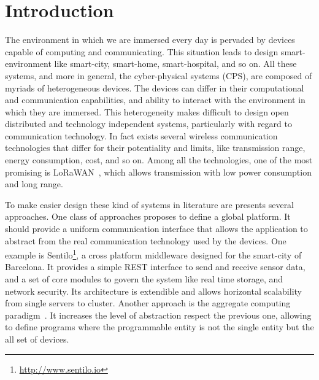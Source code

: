 \chapter{Introduction}
\label{chap:introduction}
The environment in which we are immersed every day is pervaded by devices capable of computing and communicating.
This situation leads to design smart-environment like smart-city, smart-home, smart-hospital, and so on.
All these systems, and more in general, the cyber-physical systems (CPS), are composed of myriads of heterogeneous devices.
The devices can differ in their computational and communication capabilities, and ability to interact with the environment in which they are immersed.
This heterogeneity makes difficult to design open distributed and technology independent systems, particularly with regard to communication technology.
In fact exists several wireless communication technologies that differ for their potentiality and limits, like transmission range, energy consumption, cost, and so on.
Among all the technologies, one of the most promising is \mbox{LoRaWAN}~\cite{loraalliancetechnicalcommittee2020}, which allows transmission with low power consumption and long range.

To make easier design these kind of systems in literature are presents several approaches.
One class of approaches proposes to define a global platform. 
It should provide a uniform communication interface that allows the application to abstract from the real communication technology used by the devices. 
One example is Sentilo\footnote{\href{http://www.sentilo.io}{http://www.sentilo.io}}, a cross platform middleware designed for the smart-city of Barcelona.
It provides a simple REST interface to send and receive sensor data, and a set of core modules to govern the system like real time storage, and network security. 
Its architecture is extendible and allows horizontal scalability from single servers to cluster.
% 
Another approach is the aggregate computing paradigm~\cite{BealIEEEComputer2015}.
It increases the level of abstraction respect the previous one, allowing to define programs where the programmable entity is not the single entity but the all set of devices.


